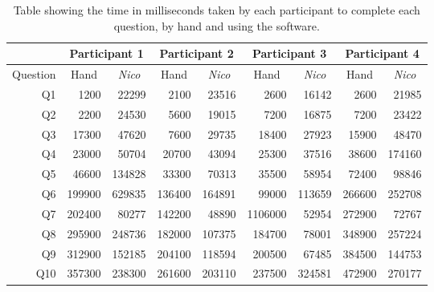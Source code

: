 \documentclass[12pt,twoside,notitlepage,xetex]{report}
\begin{document}
{\begin{center}
\begin{table}[H]
\begin{center}
\begin{tabular}{|r||r|r||r|r||r|r||r|r|}
\multicolumn{1}{c|}{} & \multicolumn{2}{c||}{Participant 1} & \multicolumn{2}{c||}{Participant 2} & \multicolumn{2}{c||}{Participant 3} & \multicolumn{2}{c|}{Participant 4}\\ \hline
\multicolumn{1}{|c||}{Question} & \multicolumn{1}{c|}{Hand} & \multicolumn{1}{c||}{\emph{Nico}} & \multicolumn{1}{c|}{Hand} & \multicolumn{1}{c||}{\emph{Nico}} & \multicolumn{1}{c|}{Hand} & \multicolumn{1}{c||}{\emph{Nico}} & \multicolumn{1}{c|}{Hand} & \multicolumn{1}{c|}{\emph{Nico}}\\ \hline \hline
Q1 & 1200 & 22299 & 2100 & 23516 & 2600 & 16142 & 2600 & 21985\\ \hline
Q2 & 2200 & 24530 & 5600 & 19015 & 7200 & 16875 & 7200 & 23422\\ \hline
Q3 & 17300 & 47620 & 7600 & 29735 & 18400 & 27923 & 15900 & 48470\\ \hline
Q4 & 23000 & 50704 & 20700 & 43094 & 25300 & 37516 & 38600 & 174160\\ \hline
Q5 & 46600 & 134828 & 33300 & 70313 & 35500 & 58954 & 72400 & 98846\\ \hline
Q6 & 199900 & 629835 & 136400 & 164891 & 99000 & 113659 & 266600 & 252708\\ \hline
Q7 & 202400 & 80277 & 142200 & 48890 & 1106000 & 52954 & 272900 & 72767\\ \hline
Q8 & 295900 & 248736 & 182000 & 107375 & 184700 & 78001 & 348900 & 257224\\ \hline
Q9 & 312900 & 152185 & 204100 & 118594 & 200500 & 67485 & 384500 & 144753\\ \hline
Q10 & 357300 & 238300 & 261600 & 203110 & 237500 & 324581 & 472900 & 270177\\
\hline
\end{tabular}
\end{center}
\caption{Table showing the time in milliseconds taken by each participant to complete each question, by hand and using the software.}
\label{tab:BigTimes}
\end{table}
\end{center}

}
\end{document}
